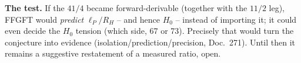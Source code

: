 \textbf{The test.} If the $41/4$ became forward-derivable (together with the
$11/2$ leg), FFGFT would \emph{predict} $\ell_P/R_H$ -- and
hence $H_0$ -- instead of importing it; it could even decide the $H_0$ tension
(which side, 67 or 73). Precisely that would turn the conjecture into evidence
(isolation/prediction/precision, Doc.~271). Until then it remains a suggestive
restatement of a measured ratio, open.
